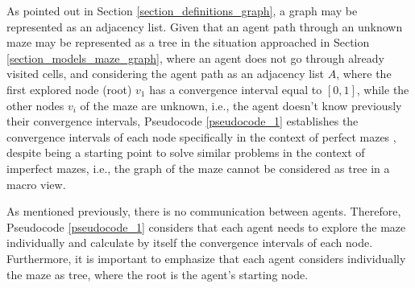 As pointed out in Section \ref{section_definitions_graph}, a graph may be represented as an adjacency list. Given that an agent path through an unknown maze may be represented as a tree in the situation approached in Section \ref{section_models_maze_graph}, where an agent does not go through already visited cells, and considering the agent path as an adjacency list $A$, where the first explored node (root) $v_{1}$ has a convergence interval equal to $[0,1]$, while the other nodes $v_{i}$ of the maze are unknown, i.e., the agent doesn't know previously their convergence intervals, Pseudocode \ref{pseudocode_1} establishes the convergence intervals of each node specifically in the context of perfect mazes \cite{Muhammad2021}, despite being a starting point to solve similar problems in the context of imperfect mazes, i.e., the graph of the maze cannot be considered as tree in a macro view.

As mentioned previously, there is no communication between agents. Therefore, Pseudocode \ref{pseudocode_1} considers that each agent needs to explore the maze individually and calculate by itself the convergence intervals of each node. Furthermore, it is important to emphasize that each agent considers individually the maze as tree, where the root is the agent's starting node.

